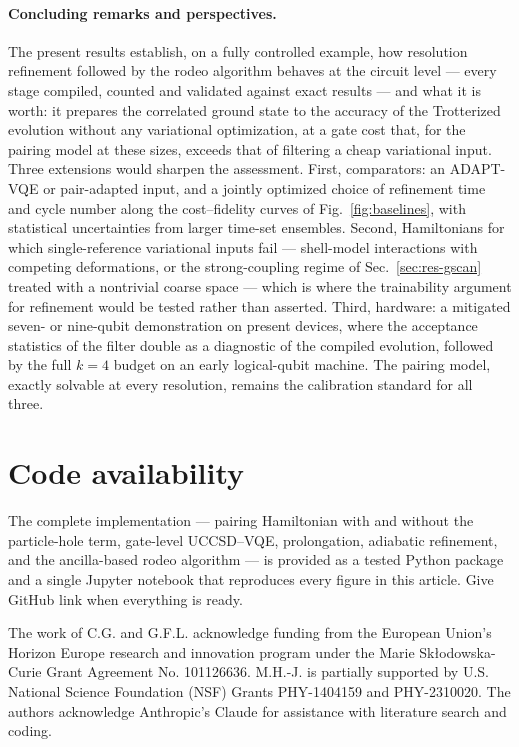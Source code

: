\documentclass[
  aps,            %
  prc,            %
  reprint,        %
  superscriptaddress,
  floatfix,
  nofootinbib
]{revtex4-2}
\begin{document}
\paragraph{Concluding remarks and perspectives.}
The present results establish, on a fully controlled example, how resolution
refinement followed by the rodeo algorithm behaves at the circuit level ---
every stage compiled, counted and validated against exact results --- and
what it is worth: it prepares the correlated ground state to the accuracy of
the Trotterized evolution without any variational optimization, at a gate
cost that, for the pairing model at these sizes, exceeds that of filtering a
cheap variational input.  Three extensions would sharpen the assessment.
First, comparators: an ADAPT-VQE or pair-adapted input, and a jointly
optimized choice of refinement time and cycle number along the cost--fidelity
curves of Fig.~\ref{fig:baselines}, with statistical uncertainties from
larger time-set ensembles.  Second, Hamiltonians for which single-reference
variational inputs fail --- shell-model interactions with competing
deformations, or the strong-coupling regime of Sec.~\ref{sec:res-gscan}
treated with a nontrivial coarse space --- which is where the trainability
argument for refinement would be tested rather than asserted.  Third,
hardware: a mitigated seven- or nine-qubit demonstration on present devices,
where the acceptance statistics of the filter double as a diagnostic of the
compiled evolution, followed by the full $k=4$ budget on an early
logical-qubit machine.  The pairing model, exactly solvable at every
resolution, remains the calibration standard for all three.

\section*{Code availability}
The complete implementation --- pairing Hamiltonian with and without the
particle-hole term, gate-level UCCSD--VQE, prolongation, adiabatic refinement,
and the ancilla-based rodeo algorithm --- is provided as a tested Python package
and a single Jupyter notebook that reproduces every figure in this article.
Give GitHub link when everything is ready.
\begin{acknowledgments}
The work of C.G. and G.F.L. acknowledge funding from the
European Union’s Horizon Europe research and innovation program under the Marie Skłodowska-Curie Grant Agreement No.
101126636. M.H.-J. is partially supported by U.S. National Science Foundation
(NSF) Grants PHY-1404159 and PHY-2310020. 
The authors  acknowledge Anthropic’s Claude
for assistance with literature search and coding.

\end{acknowledgments}
\end{document}
